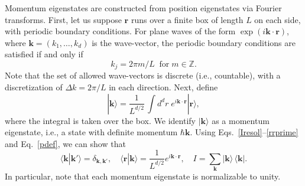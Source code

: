 \documentclass[prx,12pt]{revtex4-2}
\begin{document}
Momentum eigenstates are constructed from position eigenstates via
Fourier transforms.  First, let us suppose $\mathbf{r}$ runs over a
finite box of length $L$ on each side, with periodic boundary
conditions.  For plane waves of the form
$\exp(i\mathbf{k}\cdot\mathbf{r})$, where $\mathbf{k} = (k_1, \dots,
k_d)$ is the wave-vector, the periodic boundary conditions are
satisfied if and only if
\begin{equation}
  k_j = 2\pi m/L\;\;\mathrm{for} \;m\in\mathbb{Z}.
\end{equation}
Note that the set of allowed wave-vectors is discrete (i.e.,
countable), with a discretization of $\Delta k = 2\pi/L$ in each
direction.  Next, define
\begin{equation}
  |\mathbf{k}\rangle = \frac{1}{L^{d/2}} \, \int d^dr \; e^{i\mathbf{k}\cdot\mathbf{r}} |\mathbf{r}\rangle,
  \label{pdef}
\end{equation}
where the integral is taken over the box.  We identify
$|\mathbf{k}\rangle$ as a momentum eigenstate, i.e., a state with
definite momentum $\hbar \mathbf{k}$.  Using
Eqs.~\eqref{Iresol}--\eqref{rrprime} and Eq.~\eqref{pdef}, we can show
that
\begin{equation}
  \langle\mathbf{k}|\mathbf{k}'\rangle = \delta_{\mathbf{k},\mathbf{k}'}, \quad \langle\mathbf{r}|\mathbf{k}\rangle = \frac{1}{L^{d/2}} e^{i\mathbf{k}\cdot\mathbf{r}}, \quad I = \sum_{\mathbf{k}} |\mathbf{k}\rangle\,\langle\mathbf{k}|.
\end{equation}
In particular, note that each momentum eigenstate is normalizable to
unity.
\end{document}

